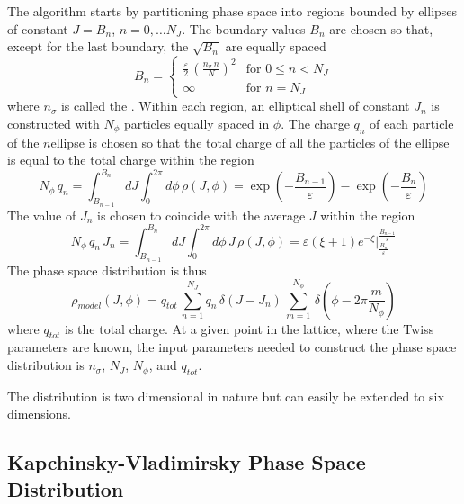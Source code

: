 The  algorithm starts by partitioning phase space into regions bounded by ellipses of
constant $J = B_n$, $n = 0, \ldots N_J$.  The boundary values $B_n$ are chosen so that, except for
the last boundary, the $\sqrt{B_n}$ are equally spaced
\begin{equation}
  B_n = 
  \begin{cases}
    \frac{\varepsilon}{2} \, \left( \frac{n_\sigma \, n}{N} \right)^2 & 
                  \text{for } 0 \le n < N_J \\
    \infty & \text{for } n = N_J
  \end{cases}
\end{equation}
where $n_\sigma$ is called the .  Within each region, an elliptical
shell of constant $J_n$ is constructed with $N_\phi$ particles equally spaced in $\phi$. The charge
$q_n$ of each particle of the $n$\Th ellipse is chosen so that the total charge of all the particles
of the ellipse is equal to the total charge within the region
\begin{equation}
  N_\phi \, q_n = 
  \int_{B_{n-1}}^{B_{n}} \!\! dJ \int_{0}^{2\pi} \!\! d\phi \, \rho(J,\phi) 
  = 
    \exp \left( -\frac{B_{n-1}}{\varepsilon} \right) - 
    \exp \left( -\frac{B_{n}}{\varepsilon} \right)
\end{equation}
The value of $J_n$ is chosen to coincide with the average $J$ within the region
\begin{equation}
  N_\phi \, q_n \, J_n = 
  \int_{B_{n-1}}^{B_{n}} \!\! dJ \int_{0}^{2\pi} \!\! d\phi \, J \, \rho(J,\phi) 
  = \varepsilon (\xi + 1) e^{-\xi} 
    \biggr\vert_{\frac{B_{n}}{\varepsilon}}^{\frac{B_{n-1}}{\varepsilon}}
\end{equation}
The  phase space distribution is thus
\begin{equation}
  \rho_{model}(J, \phi) = q_{tot} \, 
  \sum_{n=1}^{N_J} q_{n} \, \delta(J - J_{n}) \, 
  \sum_{m=1}^{N_\phi} \, \delta(\phi - 2\pi \frac{m}{N_{\phi}})
  \label{eq:rhomodel}
\end{equation}
where $q_{tot}$ is the total charge. At a given point in the lattice, where
the Twiss parameters are known, the input parameters needed to construct
the  phase space distribution is $n_\sigma$, $N_J$, $N_\phi$, 
and $q_{tot}$.

The  distribution is two dimensional in nature but can easily be 
extended to six dimensions.

\subsection{Kapchinsky-Vladimirsky Phase Space Distribution}
\label{s:kv.init}

